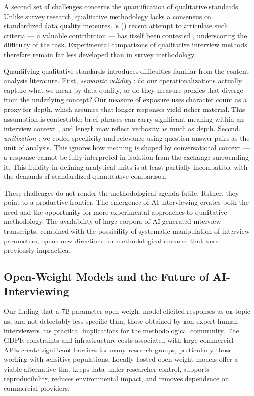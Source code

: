 \documentclass[12pt]{article}
\newcommand{\citepos}[1]{\citeauthor{#1}'s (\citeyear{#1})}
\begin{document}
A second set of challenges concerns the quantification of qualitative standards. Unlike survey research, qualitative methodology lacks a consensus on standardized data quality measures. \citepos{SmallCalarco2022} recent attempt to articulate such criteria --- a valuable contribution --- has itself been contested \citep{Tavory2023}, underscoring the difficulty of the task. Experimental comparisons of qualitative interview methods therefore remain far less developed than in survey methodology.

Quantifying qualitative standards introduces difficulties familiar from the content analysis literature. First, \textit{semantic validity} \citep{Krippendorff2012}: do our operationalizations actually capture what we mean by data quality, or do they measure proxies that diverge from the underlying concept? Our measure of exposure uses character count as a proxy for depth, which assumes that longer responses yield richer material. This assumption is contestable: brief phrases can carry significant meaning within an interview context \citep{bamberg2008small, wooffitt2005conversation}, and length may reflect verbosity as much as depth. Second, \textit{unitization} \citep{Krippendorff2012}: we coded specificity and relevance using question-answer pairs as the unit of analysis. This ignores how meaning is shaped by conversational context --- a response cannot be fully interpreted in isolation from the exchange surrounding it. This fluidity in defining analytical units is at least partially incompatible with the demands of standardized quantitative comparison.

These challenges do not render the methodological agenda futile. Rather, they point to a productive frontier. The emergence of AI-interviewing creates both the need and the opportunity for more experimental approaches to qualitative methodology. The availability of large corpora of AI-generated interview transcripts, combined with the possibility of systematic manipulation of interview parameters, opens new directions for methodological research that were previously impractical.

\subsection*{Open-Weight Models and the Future of AI-Interviewing}

Our finding that a 7B-parameter open-weight model elicited responses as on-topic as, and not detectably less specific than, those obtained by non-expert human interviewers has practical implications for the methodological community. The GDPR constraints and infrastructure costs associated with large commercial APIs create significant barriers for many research groups, particularly those working with sensitive populations. Locally hosted open-weight models offer a viable alternative that keeps data under researcher control, supports reproducibility, reduces environmental impact, and removes dependence on commercial providers.
\end{document}
